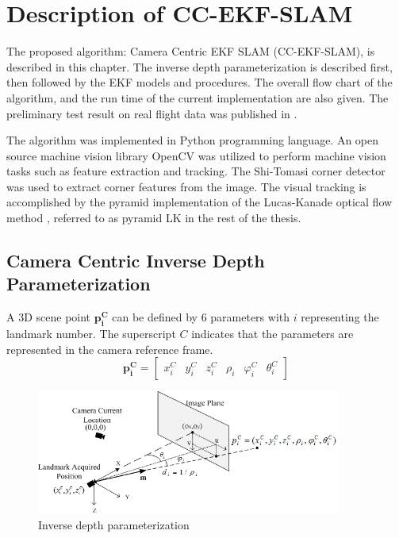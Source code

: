\chapter{Description of CC-EKF-SLAM}\label{ch:algorithm}

The proposed algorithm: Camera Centric EKF SLAM (CC-EKF-SLAM), is
described in this chapter. The inverse depth parameterization is
described first, then followed by the EKF models and procedures. The
overall flow chart of the algorithm, and the run time of the current
implementation are also given. The preliminary test result on real
flight data was published in \cite{zhang_obstacle_2012}.

The algorithm was implemented in Python programming
language\cite{_python_????}. An open source machine vision library
OpenCV\cite{_opencv_????} was utilized to perform machine vision tasks
such as feature extraction and tracking. The Shi-Tomasi corner
detector \cite{shi_good_1994} was used to extract corner features from
the image. The visual tracking is accomplished by the pyramid
implementation of the Lucas-Kanade optical flow method
\cite{bouguet_pyramidal_1999}, referred to as pyramid LK in the rest
of the thesis.

\section{Camera Centric Inverse Depth Parameterization}

\noindent A 3D scene point $\boldsymbol{p_{i}^{C}}$ can be defined by 6 parameters
with $i$ representing the landmark number. The superscript $C$
indicates that the parameters are represented in the camera reference frame.
\begin{equation}
\boldsymbol{p_{i}^{C}}=\begin{bmatrix}
x_{i}^{C} & y_{i}^{C} & z_{i}^{C} & \rho _{i} & \varphi _{i}^{C} & 
\theta _{i}^{C} 
\end{bmatrix}
\end{equation}

\begin{figure}[h]
\centering
\includegraphics[width=10cm, keepaspectratio=true]{./Figures/idp.jpg}
\caption{Inverse depth parameterization}
\label{fig:algo1}
\end{figure}

